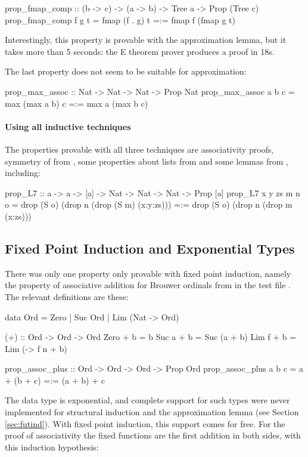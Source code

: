 \begin{code}
prop_fmap_comp :: (b -> c) -> (a -> b) -> Tree a -> Prop (Tree c)
prop_fmap_comp f g t = fmap (f . g) t =:= fmap f (fmap g t)
\end{code}

\noident
Interestingly, this property is provable with the approximation lemma,
but it takes more than 5 seconds: the E theorem prover produces a
proof in 18s.

The last property does not seem to be suitable for approximation:

\begin{code}
prop_max_assoc :: Nat -> Nat -> Nat -> Prop Nat
prop_max_assoc a b c = max (max a b) c =:= max a (max b c)
\end{code}

\paragraph{Using all inductive techniques}
The properties provable with all three techniques are associativity
proofs, symmetry of  from , some properties about
lists from  and some lemmas from
, including:

\begin{code}
prop_L7 :: a -> a -> [a] -> Nat -> Nat -> Nat -> Prop [a]
prop_L7 x y zs m n o = drop (S o) (drop n (drop (S m) (x:y:zs)))
                   =:= drop (S o) (drop n (drop m (x:zs)))
\end{code}

\subsection{Fixed Point Induction and Exponential Types}
There was only one property only provable with fixed point induction,
namely the property of associative addition for Brouwer ordinals from
\cite{dixonphd} in the test file . The relevant
definitions are these:

\begin{code}
data Ord = Zero | Suc Ord | Lim (Nat -> Ord)

(+) :: Ord -> Ord -> Ord
Zero  + b = b
Suc a + b = Suc (a + b)
Lim f + b = Lim (\n -> f n + b)

prop_assoc_plus :: Ord -> Ord -> Ord -> Prop Ord
prop_assoc_plus a b c = a + (b + c) =:= (a + b) + c
\end{code}

\noindent
The  data type is exponential, and complete support for such
types were never implemented for structural induction and the
approximation lemma (see Section \ref{sec:futind}). With fixed point
induction, this support comes for free. For the proof of associativity
the fixed functions are the first addition in both sides, with this
induction hypothesis:

